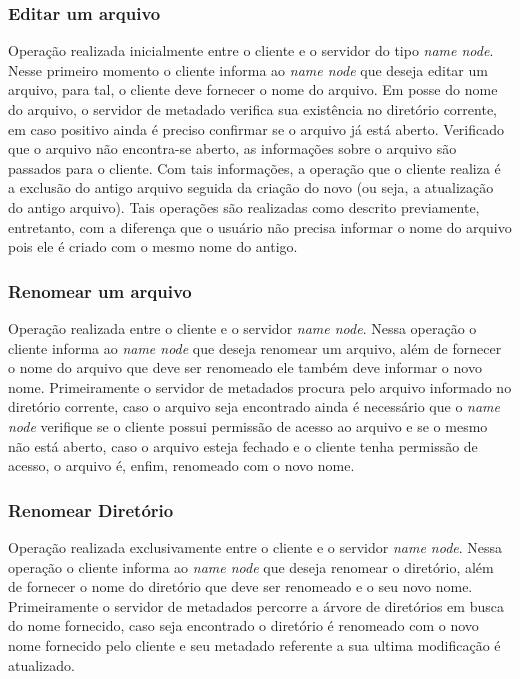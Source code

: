 	\subsubsection{Editar um arquivo}
	
	Operação realizada inicialmente entre o cliente e o servidor do tipo \textit{name node}. Nesse primeiro momento o cliente informa ao \textit{name node} que deseja editar um arquivo, para tal, o cliente deve fornecer o nome do arquivo. Em posse do nome do arquivo, o servidor de metadado verifica sua existência no diretório corrente, em caso positivo ainda é preciso confirmar se o arquivo já está aberto. Verificado que o arquivo não encontra-se aberto, as informações sobre o arquivo são passados para o cliente. Com tais informações, a operação que o cliente realiza é a exclusão do antigo arquivo seguida da criação do novo (ou seja, a atualização do antigo arquivo). Tais operações são realizadas como descrito previamente, entretanto, com a diferença que o usuário não precisa informar o nome do arquivo pois ele é criado com o mesmo nome do antigo.
	\\
	
	\subsubsection{Renomear um arquivo}
	Operação realizada entre o cliente e o servidor \textit{name node}. Nessa operação o cliente informa ao \textit{name node} que deseja renomear um arquivo, além de fornecer o nome do arquivo que deve ser renomeado ele também deve informar o novo nome. Primeiramente o servidor de metadados procura pelo arquivo informado no diretório corrente, caso o arquivo seja encontrado ainda é necessário que o \textit{name node} verifique se o cliente possui permissão de acesso ao arquivo e se o mesmo não está aberto, caso o arquivo esteja fechado e o cliente tenha permissão de acesso, o arquivo é, enfim, renomeado com o novo nome.
	\\
	
	\subsubsection{Renomear Diretório}
	
	Operação realizada exclusivamente entre o cliente e o servidor \textit{name node}. Nessa operação o cliente informa ao \textit{name node} que deseja renomear o diretório, além de fornecer o nome do diretório que deve ser renomeado e o seu novo nome. Primeiramente o servidor de metadados percorre a árvore de diretórios em busca do nome fornecido, caso seja encontrado o diretório é renomeado com o novo nome fornecido pelo cliente e seu metadado referente a sua ultima modificação é atualizado.
	\\
	
